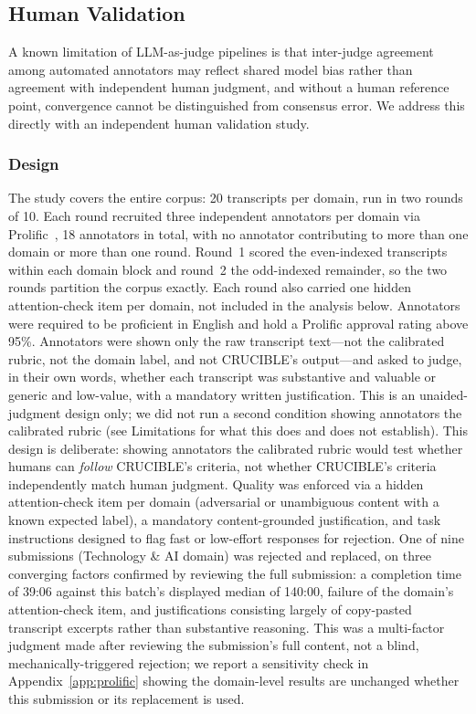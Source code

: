 \documentclass[11pt]{article}
\begin{document}
\subsection{Human Validation}
\label{sec:humanval}

A known limitation of LLM-as-judge pipelines is that inter-judge agreement
among automated annotators may reflect shared model bias rather than
agreement with independent human judgment, and without a human reference
point, convergence cannot be distinguished from consensus error. We
address this directly with an independent human validation study.

\subsubsection{Design}

The study covers the entire corpus: 20 transcripts per domain, run in two
rounds of 10. Each round recruited three independent annotators per domain
via Prolific~\cite{palan2018prolific}, 18 annotators in total, with no
annotator contributing to more than one domain or more than one round.
Round~1 scored the even-indexed transcripts within each domain block and
round~2 the odd-indexed remainder, so the two rounds partition the corpus
exactly. Each round also carried one hidden attention-check item per
domain, not included in the analysis below.
Annotators were required to be proficient in English and hold a Prolific
approval rating above 95\%. Annotators were shown only the raw transcript
text---not the calibrated rubric, not the domain label, and not CRUCIBLE's
output---and asked to judge, in their own words, whether each transcript
was substantive and valuable or generic and low-value, with a mandatory
written justification. This is an unaided-judgment design only; we did not
run a second condition showing annotators the calibrated rubric (see
Limitations for what this does and does not establish). This design is
deliberate: showing annotators the calibrated rubric would test whether
humans can \emph{follow} CRUCIBLE's criteria, not whether CRUCIBLE's
criteria independently match human judgment. Quality was enforced via a
hidden attention-check item per domain (adversarial or unambiguous content
with a known expected label), a mandatory content-grounded justification,
and task instructions designed to flag fast or low-effort responses for
rejection. One of nine submissions (Technology \& AI domain) was rejected
and replaced, on three converging factors confirmed by reviewing the full
submission: a completion time of 39:06 against this batch's displayed
median of 140:00, failure of the domain's attention-check item, and
justifications consisting largely of copy-pasted transcript excerpts
rather than substantive reasoning. This was a multi-factor judgment made
after reviewing the submission's full content, not a blind,
mechanically-triggered rejection; we report a sensitivity check in
Appendix~\ref{app:prolific} showing the domain-level results are unchanged
whether this submission or its replacement is used.
\end{document}

